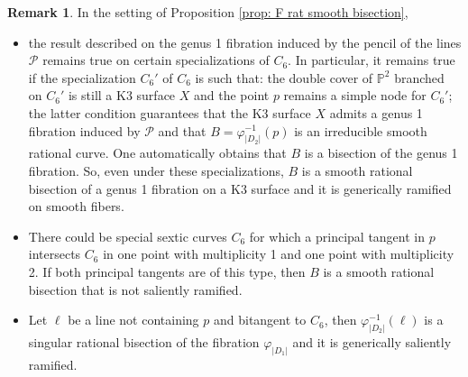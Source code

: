 \documentclass{amsart}
\theoremstyle{definition}
\newtheorem{remark}[theorem]{Remark}
\numberwithin{equation}{section}
\begin{document}
\begin{remark}\label{rem: singular rational salient bisection case g=0}
In the setting of Proposition \ref{prop: F rat smooth bisection},
\begin{itemize}
    \item[a)]
 {\rm the result described on the genus 1 fibration induced by the pencil of the lines $\mathcal{P}$ remains true on certain  specializations of $C_6$. In particular, it remains true if the specialization $C_6'$ of $C_6$ is such that: the double cover of $\mathbb{P}^2$ branched on $C_6'$ is still a K3 surface $X$ and the point $p$ remains a simple node for $C_6'$; the latter condition  guarantees that the K3 surface $X$ admits a genus 1 fibration induced by $\mathcal{P}$ and that $B=\varphi_{|D_2|}^{-1}(p)$ is an irreducible smooth rational curve. One automatically obtains that $B$ is a bisection of the genus 1 fibration. So, even under these specializations, $B$ is a smooth rational bisection of a genus 1 fibration on a K3 surface and it is generically ramified on smooth fibers.}

 \item[b)] {\rm There could be special sextic curves $C_6$ for which a principal tangent in $p$ intersects $C_6$ in one point with multiplicity 1 and one point with multiplicity 2. If both principal tangents are of this type, then $B$ is a smooth rational bisection that is not saliently ramified.}

 \item[c)] {\rm  Let $\ell$ be a line not containing $p$ and bitangent to $C_6$, then $\varphi_{|D_2|}^{-1}(\ell)$ is a singular rational bisection of the fibration $\varphi_{|D_1|}$ and it is generically saliently ramified.}
\end{itemize}
\end{remark}


    
\end{document}
